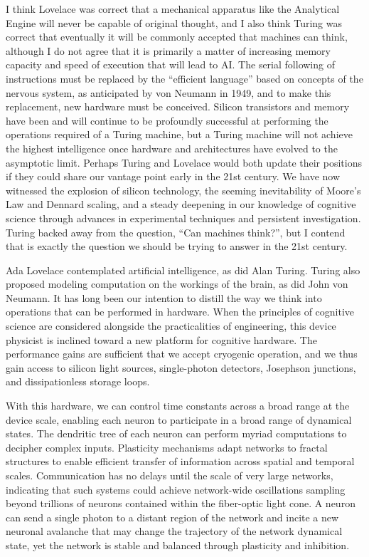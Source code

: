 \documentclass[twocolumn]{article}
\begin{document}
I think Lovelace was correct that a mechanical apparatus like the Analytical Engine will never be capable of original thought, and I also think Turing was correct that eventually it will be commonly accepted that machines can think, although I do not agree that it is primarily a matter of increasing memory capacity and speed of execution that will lead to AI. The serial following of instructions must be replaced by the ``efficient language'' based on concepts of the nervous system, as anticipated by von Neumann in 1949, and to make this replacement, new hardware must be conceived. Silicon transistors and memory have been and will continue to be profoundly successful at performing the operations required of a Turing machine, but a Turing machine will not achieve the highest intelligence once hardware and architectures have evolved to the asymptotic limit. Perhaps Turing and Lovelace would both update their positions if they could share our vantage point early in the 21st century. We have now witnessed the explosion of silicon technology, the seeming inevitability of Moore's Law and Dennard scaling, and a steady deepening in our knowledge of cognitive science through advances in experimental techniques and persistent investigation. Turing backed away from the question, ``Can machines think?'', but I contend that is exactly the question we should be trying to answer in the 21st century. 


\vspace{3em}
Ada Lovelace contemplated artificial intelligence, as did Alan Turing. Turing also proposed modeling computation on the workings of the brain, as did John von Neumann. It has long been our intention to distill the way we think into operations that can be performed in hardware. When the principles of cognitive science are considered alongside the practicalities of engineering, this device physicist is inclined toward a new platform for cognitive hardware. The performance gains are sufficient that we accept cryogenic operation, and we thus gain access to silicon light sources, single-photon detectors, Josephson junctions, and dissipationless storage loops.

With this hardware, we can control time constants across a broad range at the device scale, enabling each neuron to participate in a broad range of dynamical states. The dendritic tree of each neuron can perform myriad computations to decipher complex inputs. Plasticity mechanisms adapt networks to fractal structures to enable efficient transfer of information across spatial and temporal scales. Communication has no delays until the scale of very large networks, indicating that such systems could achieve network-wide oscillations sampling beyond trillions of neurons contained within the fiber-optic light cone. A neuron can send a single photon to a distant region of the network and incite a new neuronal avalanche that may change the trajectory of the network dynamical state, yet the network is stable and balanced through plasticity and inhibition.
\end{document}
